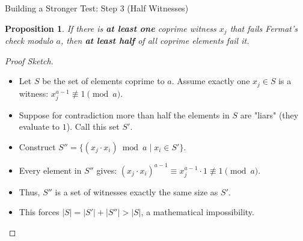 \documentclass[10pt, compress]{beamer}
\newtheorem{proposition}{Proposition}
\begin{document}
\begin{frame}{Building a Stronger Test: Step 3 (Half Witnesses)}
    \begin{proposition}
    If there is \textbf{at least one} coprime witness $x_j$ that fails Fermat's check modulo $a$, then \textbf{at least half} of all coprime elements fail it.
    \end{proposition}
    
    \pause
    \begin{proof}[Proof Sketch]
        \begin{itemize}[<+->]
            \item Let $S$ be the set of elements coprime to $a$. Assume exactly one $x_j \in S$ is a witness: $x_j^{a-1} \not\equiv 1 \pmod a$.
            \item Suppose for contradiction more than half the elements in $S$ are "liars" (they evaluate to $1$). Call this set $S'$.
            \item Construct $S'' = \{(x_j \cdot x_i) \bmod a \mid x_i \in S'\}$.
            \item Every element in $S''$ gives: $(x_j \cdot x_i)^{a-1} \equiv x_j^{a-1} \cdot 1 \not\equiv 1 \pmod a$.
            \item Thus, $S''$ is a set of witnesses exactly the same size as $S'$.
            \item This forces $|S| = |S'| + |S''| > |S|$, a mathematical impossibility.
        \end{itemize}
    \end{proof}
\end{frame}
\end{document}
